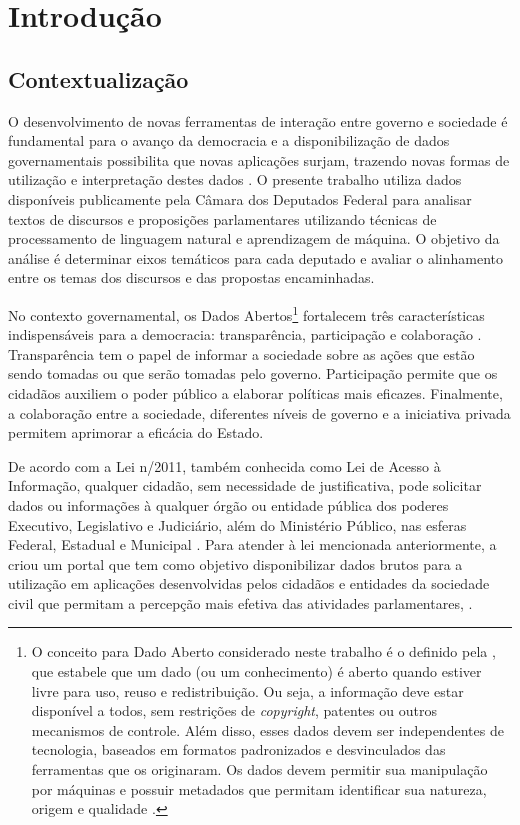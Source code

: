 \chapter{Introdução}

\section{Contextualização}
\label{sec:contextualização}

O desenvolvimento de novas ferramentas de interação entre governo e sociedade é fundamental para o avanço da democracia e a disponibilização de dados governamentais possibilita que novas aplicações surjam, trazendo novas formas de utilização e interpretação destes dados \cite{consegi2011}. O presente trabalho utiliza dados disponíveis publicamente pela Câmara dos Deputados Federal para analisar textos de discursos e proposições parlamentares utilizando técnicas de processamento de linguagem natural e aprendizagem de máquina. O objetivo da análise é determinar eixos temáticos para cada deputado e avaliar o alinhamento entre os temas dos discursos e das propostas encaminhadas.

No contexto governamental, os Dados Abertos\footnote{O conceito para Dado Aberto considerado neste trabalho é o definido pela , que estabele que um dado (ou um conhecimento) é aberto quando estiver livre para uso, reuso e redistribuição. Ou seja, a informação deve estar disponível a todos, sem restrições de \textit{copyright}, patentes ou outros mecanismos de controle. Além disso, esses dados devem ser independentes de tecnologia, baseados em formatos padronizados e desvinculados das ferramentas que os originaram. Os dados devem permitir sua manipulação por máquinas e possuir metadados que permitam identificar sua natureza, origem e qualidade \cite{diniz2010}.} fortalecem três características indispensáveis para a democracia: transparência, participação e colaboração \cite{consegi2011}. Transparência tem o papel de informar a sociedade sobre as ações que estão sendo tomadas ou que serão tomadas pelo governo. Participação permite que os cidadãos auxiliem o poder público a elaborar políticas mais eficazes. Finalmente, a colaboração entre a sociedade, diferentes níveis de governo e a iniciativa privada permitem aprimorar a eficácia do Estado.

De acordo com a Lei n/2011, também conhecida como Lei de Acesso à Informação, qualquer cidadão, sem necessidade de justificativa, pode solicitar dados ou informações à qualquer órgão ou entidade pública dos poderes Executivo, Legislativo e Judiciário, além do Ministério Público, nas esferas Federal, Estadual e Municipal \cite{lei_acesso_informacao}. Para atender à lei mencionada anteriormente, a  criou um portal que tem como objetivo disponibilizar dados brutos para a utilização em aplicações desenvolvidas pelos cidadãos e entidades da sociedade civil que permitam a percepção mais efetiva das atividades parlamentares, .

